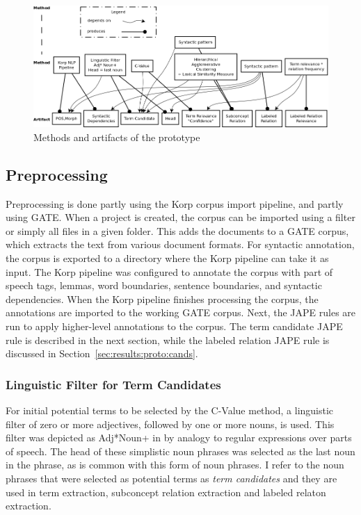 \documentclass[a4paper]{report}
\begin{document}
\begin{figure}
  \includegraphics[width=\textwidth]{graphics/method-element-dependencies.png}
  \caption{Methods and artifacts of the prototype}
  \label{fig:method-artifact}
\end{figure}

\subsection{Preprocessing}
Preprocessing is done partly using the Korp corpus import pipeline, and partly using GATE.
When a project is created, the corpus can be imported using a filter or simply all files in a given folder.
This adds the documents to a GATE corpus, which extracts the text from various document formats.
For syntactic annotation, the corpus is exported to a directory where the Korp pipeline can take it as input.
The Korp pipeline was configured to annotate the corpus with part of speech tags, lemmas, word boundaries, sentence boundaries, and syntactic dependencies.
When the Korp pipeline finishes processing the corpus, the annotations are imported to the working GATE corpus.
Next, the JAPE rules are run to apply higher-level annotations to the corpus.
The term candidate JAPE rule is described in the next section, while the labeled relation JAPE rule is discussed in Section~\ref{sec:results:proto:cands}.

\subsubsection{Linguistic Filter for Term Candidates}
\label{sec:results:proto:prepr}

For initial potential terms to be selected by the C-Value method, a linguistic filter of zero or more adjectives, followed by one or more nouns, is used.
This filter was depicted as Adj*Noun+ in \cite{Frantzi98CNCValue} by analogy to regular expressions over parts of speech.
The head of these simplistic noun phrases was selected as the last noun in the phrase, as is common with this form of noun phrases.
I refer to the noun phrases that were selected as potential terms as \emph{term candidates} and they are used in term extraction, subconcept relation extraction and labeled relaton extraction.
\end{document}
